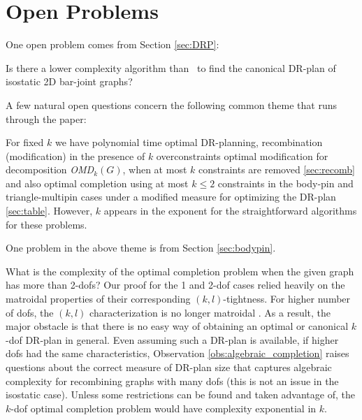 \section{Open Problems}
\label{sec:appendix:b}

\label{sec:futurework}

One open problem comes from Section \ref{sec:DRP}:
\begin{openproblem}
    Is there a lower complexity algorithm than \candrpcomplexityv\ to find the canonical DR-plan of isostatic 2D bar-joint graphs?
\end{openproblem}


A few natural  open questions concern the following common theme that runs through the paper:

\begin{openproblem}
    For fixed $k$ we have polynomial time optimal DR-planning, recombination (modification) in the presence of $k$ overconstraints  optimal modification for decomposition {\sl OMD}$_k(G)$, when at most $k$ constraints are removed \ref{sec:recomb} and also optimal completion using at most $k\le 2$ constraints in the body-pin and triangle-multipin cases under a modified measure for optimizing the DR-plan \ref{sec:table}. However, $k$ appears in the exponent for the straightforward algorithms for these problems.
\end{openproblem}

One problem in the above theme is from Section \ref{sec:bodypin}.
\begin{openproblem}
    What is the complexity of the optimal completion problem when the given graph has more than 2-dofs? Our proof for the 1 and 2-dof cases relied heavily on the matroidal properties of their corresponding $(k,l)$-tightness. For higher number of dofs, the $(k,l)$ characterization is no longer matroidal \cite{Lee:2007:PGA}. As a result, the major obstacle is that there is no easy way of obtaining an optimal or canonical $k$-dof DR-plan in general. Even assuming such  a DR-plan is available, if higher dofs had the same characteristics, Observation \ref{obs:algebraic_completion} raises questions about the correct measure of DR-plan size that captures algebraic complexity for recombining graphs with many dofs (this is not an issue in the isostatic case). Unless some restrictions can be found and taken advantage of, the $k$-dof optimal completion problem would  have complexity exponential in $k$.
\end{openproblem}

